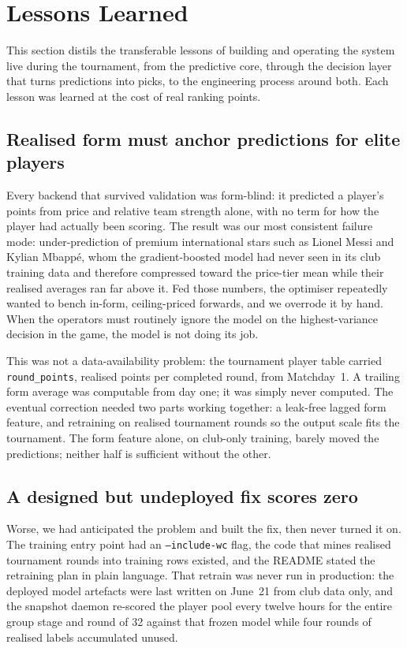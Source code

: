 \section{Lessons Learned}
\label{sec:lessons}

This section distils the transferable lessons of building and
operating the system live during the tournament, from the predictive
core, through the decision layer that turns predictions into picks, to
the engineering process around both. Each lesson was learned at the
cost of real ranking points.

\subsection{Realised form must anchor predictions for elite players}
\label{sec:lessons-form-anchor}

Every backend that survived validation was form-blind: it predicted a
player's points from price and relative team strength alone, with no
term for how the player had actually been scoring. The result was our
most consistent failure mode: under-prediction of premium
international stars such as Lionel Messi and Kylian Mbapp\'e, whom the
gradient-boosted model had never seen in its club training data and
therefore compressed toward the price-tier mean while their realised
averages ran far above it. Fed those numbers, the optimiser repeatedly
wanted to bench in-form, ceiling-priced forwards, and we overrode it
by hand. When the operators must routinely ignore the model on the
highest-variance decision in the game, the model is not doing its job.

This was not a data-availability problem: the tournament player table
carried \texttt{round\_points}, realised points per completed round,
from Matchday~1. A trailing form average was computable from day one;
it was simply never computed. The eventual correction needed two parts
working together: a leak-free lagged form feature, and retraining on
realised tournament rounds so the output scale fits the tournament.
The form feature alone, on club-only training, barely moved the
predictions; neither half is sufficient without the other.

\subsection{A designed but undeployed fix scores zero}
\label{sec:lessons-deploy}

Worse, we had anticipated the problem and built the fix, then never
turned it on. The training entry point had an \texttt{--include-wc}
flag, the code that mines realised tournament rounds into training
rows existed, and the README stated the retraining plan in plain
language. That retrain was never run in production: the deployed model
artefacts were last written on June~21 from club data only, and the
snapshot daemon re-scored the player pool every twelve hours for the
entire group stage and round of 32 against that frozen model while
four rounds of realised labels accumulated unused.

